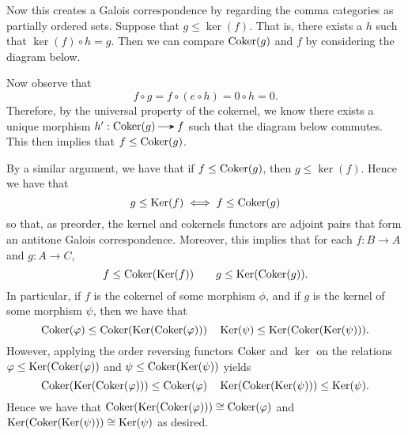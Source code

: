 \begin{prf}
    Now this creates a Galois correspondence by regarding the comma categories as 
    partially ordered sets. Suppose that $g \le \ker(f)$. That is, there exists a $h$ such that 
    $\ker(f) \circ h = g$. Then we can compare $\operatorname{\mathrm{Coker}}(g)$ and $f$ by considering the diagram below. 
    \begin{center}
    \end{center}
    Now observe that 
    \[
        f \circ g = f \circ (e \circ h) = 0 \circ h = 0.
    \]
    Therefore, by the universal property of the cokernel, we know there 
    exists a unique morphism $h': \coker(g) \to f$ such that the diagram 
    below commutes. This then implies that $f \le \operatorname{\mathrm{Coker}}(g)$. 
    \begin{center}
    \end{center}
    By a similar argument, we have that if $f \le \operatorname{\mathrm{Coker}}(g)$, 
    then $g \le \ker(f)$. Hence we have that 
    \[
        g \le \operatorname{\mathrm{Ker}}(f) \iff f \le \operatorname{\mathrm{Coker}}(g)
    \]
    so that, as preorder, the kernel and cokernels functors are adjoint pairs 
    that form an antitone Galois correspondence. Moreover, this implies that
    for each $f: B \to A$ and $g: A \to C$,
    \[
        f \le \operatorname{\mathrm{Coker}}(\operatorname{\mathrm{Ker}}(f)) \qquad g \le \operatorname{\mathrm{Ker}}(\operatorname{\mathrm{Coker}}(g)).
    \]
    In particular, if $f$ is the cokernel of some morphism $\phi$, and if $g$ is
    the kernel of some morphism $\psi$, then we have that 
    \[
        \operatorname{\mathrm{Coker}}(\varphi) \le \operatorname{\mathrm{Coker}}(\operatorname{\mathrm{Ker}}(\operatorname{\mathrm{Coker}}(\varphi)))
        \quad
        \operatorname{\mathrm{Ker}}(\psi) \le \operatorname{\mathrm{Ker}}(\operatorname{\mathrm{Coker}}(\operatorname{\mathrm{Ker}}(\psi))).
    \]
    However, applying the order reversing functors $\operatorname{\mathrm{Coker}}$ and $\ker$ on the relations 
    $\varphi \le \operatorname{\mathrm{Ker}}(\operatorname{\mathrm{Coker}}(\varphi))$ and $\psi \le \operatorname{\mathrm{Coker}}(\operatorname{\mathrm{Ker}}(\psi))$ yields 
    \[
        \operatorname{\mathrm{Coker}}(\operatorname{\mathrm{Ker}}(\operatorname{\mathrm{Coker}}(\varphi))) \le \operatorname{\mathrm{Coker}}(\varphi)
        \quad 
        \operatorname{\mathrm{Ker}}(\operatorname{\mathrm{Coker}}(\operatorname{\mathrm{Ker}}(\psi))) \le \operatorname{\mathrm{Ker}}(\psi).
    \]
    Hence we have that $\operatorname{\mathrm{Coker}}(\operatorname{\mathrm{Ker}}(\operatorname{\mathrm{Coker}}(\varphi))) \cong \operatorname{\mathrm{Coker}}(\varphi)$
    and
    $\operatorname{\mathrm{Ker}}(\operatorname{\mathrm{Coker}}(\operatorname{\mathrm{Ker}}(\psi))) \cong \operatorname{\mathrm{Ker}}(\psi)$ as desired. 
\end{prf}






